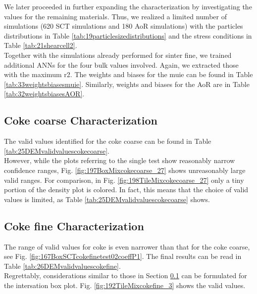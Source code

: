 We later proceeded in further expanding the characterization by investigating
the values for the remaining materials.
Thus, we realized a limited number of simulations (620 \acs{SCT} simulations
and 180 \acs{AoR} simulations) with the particles distributions in Table
\ref{tab:19particlesizedistributions} and the stress conditions in Table
\ref{tab:21shearcell2}.\\
Together with the simulations already performed for sinter fine, we trained
additional \acs{ANNs} for the four bulk values involved.
Again, we extracted those with the maximum \acs{r2}.
The weights and biases for the \acs{muie} can be found in Table
\ref{tab:33weightsbiasesmuie}.
Similarly, weights and biases for the \acs{AoR} are in Table
\ref{tab:32weightsbiasesAOR}.





\subsection{Coke coarse Characterization}
\label{subsec:cokecoarsecharacterization}

The valid values identified for the coke coarse can be found in Table
\ref{tab:25DEMvalidvaluescokecoarse}.\\
However, while the plots referring to the single test show reasonably narrow
confidence ranges, Fig. \ref{fig:197BoxMixcokecoarse_27} shows unreasonably
large valid ranges.
For comparison, in Fig. \ref{fig:198TileMixcokecoarse_27} only a tiny portion of
the density plot is colored.
In fact, this means that the choice of valid values is limited, as Table
\ref{tab:25DEMvalidvaluescokecoarse} shows.


%


\subsection{Coke fine Characterization}
\label{subsec:cokefinecharacterization}

The range of valid values for coke is even narrower than that for the coke
coarse, see Fig. \ref{fig:167BoxSCTcokefinetest02coeffP1}.
The final results can be read in Table \ref{tab:26DEMvalidvaluescokefine}.\\
Regrettably, considerations similar to those in Section
\ref{subsec:cokecoarsecharacterization} can be formulated for the intersation
box plot.
Fig. \ref{fig:192TileMixcokefine_3} shows the valid values.

